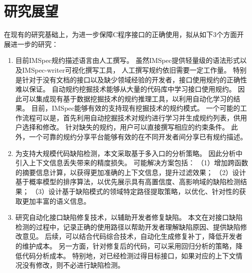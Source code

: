 \section{研究展望}
\label{sec:5.2}
在现有的研究基础上，为进一步保障C程序接口的正确使用，拟从如下3个方面开展进一步的研究：
\begin{enumerate}
	\item 目前IMSpec规约描述语言由人工撰写。
	虽然IMSpec提供轻量级的语法形式以及IMSpec-writer可视化撰写工具，
	人工撰写规约依旧需要一定工作量。
	特别是针对于没有文档的接口以及缺少领域经验的开发者，接口使用规约的正确性难以保证。
	自动规约挖掘技术能够从大量的代码库中学习接口使用规约。
	因此可以集成现有基于数据挖掘技术的规约推理工具，以利用自动化学习的结果。
	目前，IMSpec能够有效的支持现有挖掘技术的规约模式。
	一个可能的工作流程可以是，首先利用自动挖掘技术对规约进行学习并生成规约列表，供用户选择和修改。
	针对缺失的规约，用户可以直接撰写相应的约束条件。
	此外，一个可靠的规约分享平台能够有效的在不同开发者间分享已有规约描述。
	
	\item 为支持大规模代码缺陷检测，本文采取基于多入口的分析策略。
	因此分析中引入上下文信息丢失带来的精度损失。
	可能解决方案包括：
	（1）增加跨函数的摘要信息计算，以获得更加准确的上下文信息，提升过滤效果；
	（2）设计基于概率模型的排序算法，以优先展示具有高置信度、高影响域的缺陷检测结果；
	（3）设计基于缺陷模式的领域特定路径提取策略，以优化、针对性的获取更加丰富的语义信息。
	
	
	\item 研究自动化接口缺陷修复技术，以辅助开发者修复缺陷。
	本文在对接口缺陷检测的过程中，记录正确的使用路径以帮助开发者理解缺陷原因、提供缺陷修改意见。
	后续，可以结合代码综合技术，自动化生成修复补丁，降低开发者的维护成本。
	另一方面，针对修复后的代码，可以采用回归分析的策略，降低代码分析成本。
	特别地，对已经检测过得目标接口，如果对应的上下文情况没有修改，则不必进行缺陷检测。
\end{enumerate}
